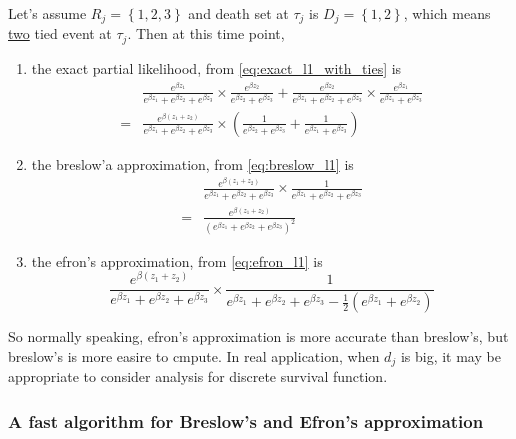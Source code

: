 \documentclass[a4paper,12pt]{article}
\begin{document}
Let's assume $R_j = \left\{1, 2, 3\right\}$ and death set at $\tau_j$ is $D_j = \left\{1, 2\right\}$, which means \underline{two} tied event at $\tau_j$. Then at this time point,
\begin{enumerate}
\item the exact partial likelihood, from \eqref{eq:exact_l1_with_ties} is
\[
  \begin{aligned}
    & \frac{
      e^{\beta z_1}
    }{
      e^{\beta z_1} + e^{\beta z_2} + e^{\beta z_3}
    }
    \times \frac{
      e^{\beta z_2}
    }{
      e^{\beta z_2} + e^{\beta z_3}
    }
    + \frac{
      e^{\beta z_2}
    }{
      e^{\beta z_1} + e^{\beta z_2} + e^{\beta z_3}
    }
    \times \frac{
      e^{\beta z_1}
    }{
      e^{\beta z_1} + e^{\beta z_3}
    }    \\
    =& \frac{
      e^{\beta\left(z_1 + z_2\right)}
    }{
      e^{\beta z_1} + e^{\beta z_2} + e^{\beta z_3}
    }
    \times \left(
      \frac{1}{e^{\beta z_2} + e^{\beta z_3}}
      + \frac{1}{e^{\beta z_1} + e^{\beta z_3}}
    \right)
  \end{aligned}
\]
\item the breslow'a approximation, from \eqref{eq:breslow_l1} is
  \[
    \begin{aligned}
      & \frac{
      e^{\beta\left(z_1 + z_2\right)}
    }{
      e^{\beta z_1} + e^{\beta z_2} + e^{\beta z_3}
    }
      \times
      \frac{1}{
        e^{\beta z_1} + e^{\beta z_2} + e^{\beta z_3}
      }    \\
      =& \frac{
        e^{\beta\left(z_1 + z_2\right)}
      }{
        \left(
          e^{\beta z_1} + e^{\beta z_2} + e^{\beta z_3}
        \right)^2
      }
    \end{aligned}
  \]
\item the efron's approximation, from \eqref{eq:efron_l1} is
  \[
    \frac{
      e^{\beta\left(z_1 + z_2\right)}
    }{
      e^{\beta z_1} + e^{\beta z_2} + e^{\beta z_3}
      }
      \times
      \frac{1}{
        e^{\beta z_1} + e^{\beta z_2} + e^{\beta z_3}
        - \frac{1}{2}\left(
          e^{\beta z_1} + e^{\beta z_2}
        \right)
      }
  \]
\end{enumerate}
So normally speaking, efron's approximation is more accurate than breslow's, but breslow's is more easire to cmpute. In real application, when $d_j$ is big, it may be appropriate to consider analysis for discrete survival function.

\subsubsection{A fast algorithm for Breslow's and Efron's approximation}
\label{sec:fast-algor-bresl}
\end{document}
